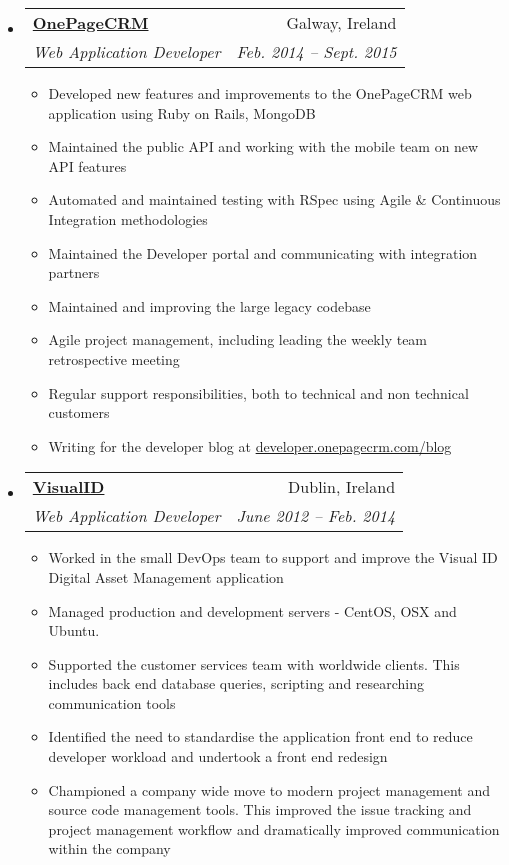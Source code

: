 \documentclass[letterpaper,11pt]{article}
\makeatletter
\newcommand{\resitem}[1]{\item #1 \vspace{-2pt}}
\newcommand{\ressubheading}[4]{
\begin{tabular*}{6.5in}{l@{\extracolsep{\fill}}r}
		\textbf{#1} & #2 \\
		\textit{#3} & \textit{#4} \\
\end{tabular*}\vspace{-6pt}}
\makeatother
\begin{document}
\begin{itemize}
	\item 
      \ressubheading{\href{http://www.onepagecrm.com}{OnePageCRM}}{Galway, Ireland}
        {Web Application Developer}{Feb. 2014 -- Sept. 2015}
        {
        \begin{itemize}
          \resitem{Developed new features and improvements to the OnePageCRM web application using Ruby on Rails, MongoDB}
          \resitem{Maintained the public API and working with the mobile team on new API features}
          \resitem{Automated and maintained testing with RSpec using Agile \& Continuous Integration methodologies}
          \resitem{Maintained the Developer portal and communicating with integration partners}
          \resitem{Maintained and improving the large legacy codebase}
          \resitem{Agile project management, including leading the weekly team retrospective meeting}
          \resitem{Regular support responsibilities, both to technical and non technical customers}
          \resitem{Writing for the developer blog at \href{http://developer.onepagecrm.com/blog}{developer.onepagecrm.com/blog}}
        \end{itemize}
        }

		  \item 
      \ressubheading{\href{http://visualid.com}{VisualID}}{Dublin, Ireland}{Web Application Developer}{June 2012 -- Feb. 2014}
        { 
        \begin{itemize}
      	 \resitem{Worked in the small DevOps team to support and improve the Visual ID Digital Asset Management application}
          \resitem{Managed production and development servers - CentOS, OSX and Ubuntu. }
          \resitem{Supported the customer services team with worldwide clients. This includes back end database queries, scripting and researching communication tools}
          \resitem{Identified the need to standardise the application front end to reduce developer workload and undertook a front end redesign}
          \resitem{Championed a company wide move to modern project management and source code management tools. This improved the issue tracking and project management workflow and dramatically improved communication within the company}
        \end{itemize}
        }

\end{itemize}  %
\end{document}
